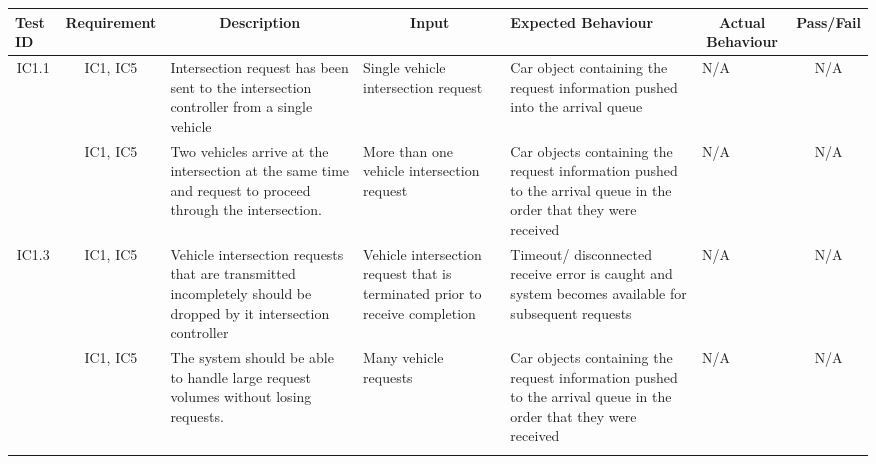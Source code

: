 \documentclass [10pt]{article}
\begin{document}
  \begin{longtable}{ | p{ } | p{ } |  p{ } |  p{ } | p{ } | p{ } |  p{ } |}  \hline

    \rowcolor{subsectionC}\textbf{Test ID}
    & \multicolumn{1}{c|}{\textbf{Requirement} }
    &\multicolumn{1}{c|}{\textbf{Description} }
    & \multicolumn{1}{c|}{\textbf{Input} }
    & \textbf{Expected Behaviour} 
    & \multicolumn{1}{c|}{\textbf{Actual Behaviour} }
    & \multicolumn{1}{c|}{\textbf{Pass/Fail}} \\  \hline
    
    \multicolumn{1}{|c|}{IC1.1} 
    & \multicolumn{1}{c|}{IC1, IC5}
    & Intersection request has been sent to the intersection controller from a single vehicle
    & Single vehicle intersection request 
    & Car object containing the request information pushed into the arrival queue
    & N/A
    & \multicolumn{1}{c|}{N/A}\\ \hline
    \rowcolor{tableCell}\multicolumn{1}{|c|}{IC1.2} 
    & \multicolumn{1}{c|}{IC1, IC5}
    & Two vehicles arrive at the intersection at the same time and request to proceed through the intersection. 
    & More than one vehicle intersection request 
    & Car objects containing the request information pushed to the arrival queue in the order that they were received 
    & N/A
    & \multicolumn{1}{c|}{N/A}\\ \hline
    
    \multicolumn{1}{|c|}{IC1.3} 
    & \multicolumn{1}{c|}{IC1, IC5}
    & Vehicle intersection requests that are transmitted incompletely should be dropped by it intersection controller
    &  Vehicle intersection request that is terminated prior to receive completion
    & Timeout/ disconnected receive error is caught and system becomes available for subsequent requests
    & N/A
    & \multicolumn{1}{c|}{N/A}\\ \hline 
    
    
    
  
  
    
    \rowcolor{tableCell}\multicolumn{1}{|c|}{IC1.4} 
    & \multicolumn{1}{c|}{IC1, IC5}
    & The system should be able to handle large request volumes without losing requests. 
    & Many vehicle requests
    &  Car objects containing the request information pushed to the arrival queue in the order that they were received 
    & N/A
    & \multicolumn{1}{c|}{N/A}\\ \hline
    \newpage \hline



\end{longtable}
\end{document}
